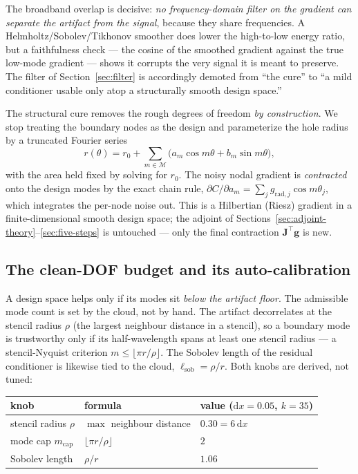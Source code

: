 \documentclass[11pt,a4paper]{article}
\newcommand{\mat}[1]{\mathbf{#1}}
\newcommand{\vect}[1]{\boldsymbol{#1}}
\begin{document}
The broadband overlap is decisive: \emph{no frequency-domain filter on the
gradient can separate the artifact from the signal}, because they share
frequencies. A Helmholtz/Sobolev/Tikhonov smoother does lower the high-to-low
energy ratio, but a faithfulness check --- the cosine of the smoothed gradient
against the true low-mode gradient --- shows it corrupts the very signal it is
meant to preserve. The filter of Section~\ref{sec:filter} is accordingly demoted
from ``the cure'' to ``a mild conditioner usable only atop a structurally smooth
design space.''

The structural cure removes the rough degrees of freedom \emph{by construction}.
We stop treating the boundary nodes as the design and parameterize the hole
radius by a truncated Fourier series
\begin{equation}
  r(\theta) = r_0 + \sum_{m\in\mathcal M}\big(a_m\cos m\theta + b_m\sin m\theta\big),
  \label{eq:fourier-hole}
\end{equation}
with the area held fixed by solving for $r_0$. The noisy nodal gradient is
\emph{contracted} onto the design modes by the exact chain rule,
$\partial C/\partial a_m = \sum_j g_{\mathrm{rad},j}\cos m\theta_j$, which
integrates the per-node noise out. This is a Hilbertian (Riesz) gradient in a
finite-dimensional smooth design space; the adjoint of
Sections~\ref{sec:adjoint-theory}--\ref{sec:five-steps} is untouched --- only the
final contraction $\mat J^\top\vect g$ is new.

\subsection{The clean-DOF budget and its auto-calibration}

A design space helps only if its modes sit \emph{below the artifact floor}. The
admissible mode count is set by the cloud, not by hand. The artifact decorrelates
at the stencil radius $\rho$ (the largest neighbour distance in a stencil), so a
boundary mode is trustworthy only if its half-wavelength spans at least one
stencil radius --- a stencil-Nyquist criterion
$m \le \lfloor \pi r/\rho \rfloor$. The Sobolev length of the residual
conditioner is likewise tied to the cloud, $\ell_{\mathrm{sob}} = \rho/r$. Both
knobs are derived, not tuned:

\begin{center}
\begin{tabular}{lll}
\hline
knob & formula & value ($\mathrm{d}x{=}0.05$, $k{=}35$) \\
\hline
stencil radius $\rho$ & $\max$ neighbour distance & $0.30 = 6\,\mathrm{d}x$ \\
mode cap $m_{\mathrm{cap}}$ & $\lfloor \pi r/\rho \rfloor$ & $2$ \\
Sobolev length & $\rho/r$ & $1.06$ \\
\hline
\end{tabular}
\end{center}
\end{document}
